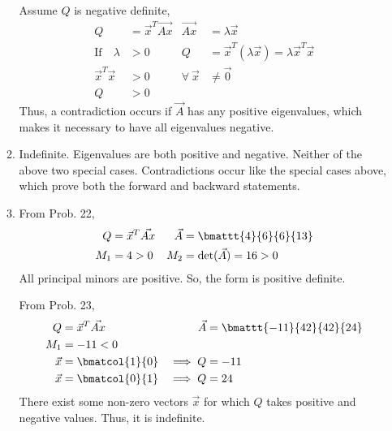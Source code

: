 \begin{enumerate}
\begin{enumerate}
                    Assume $ Q $ is negative definite,
                    \begin{align}
                        Q                        & = \vec{x}^T \vec{Ax}          &
                        \vec{Ax}                 & = \lambda \vec{x}               \\
                        \text{If} \quad  \lambda & > 0                           &
                        Q                        & = \vec{x}^T (\lambda \vec{x})
                        = \lambda \vec{x}^T \vec{x}                                \\
                        \vec{x}^T \vec{x}        & > 0                           &
                        \forall\ \vec{x}         & \neq \vec{0}                    \\
                        Q                        & > 0
                    \end{align}
                    Thus, a contradiction occurs if $ \vec{A} $ has any positive
                    eigenvalues, which makes it necessary to have all eigenvalues
                    negative.

              \item Indefinite. Eigenvalues are both positive and negative.
                    Neither of the above two special cases. Contradictions occur like
                    the special cases above, which prove both the forward and backward
                    statements.

              \item From Prob. 22,
                    \begin{align}
                        Q       & = \vec{x}^T \vec{Ax}     &
                        \vec{A} & = \bmattt{4}{6}{6}{13}     \\
                        M_1     & = 4 > 0                  &
                        M_2     & = \det(\vec{A}) = 16 > 0   \\
                    \end{align}
                    All principal minors are positive. So, the form is positive
                    definite. \par
                    From Prob. 23,
                    \begin{align}
                        Q          & = \vec{x}^T \vec{Ax}       &
                        \vec{A}    & = \bmattt{-11}{42}{42}{24}   \\
                        M_1        & = -11 < 0                    \\
                        \vec{x}    & = \bmatcol{1}{0}           &
                        \implies Q & = -11 \\
                        \vec{x}    & = \bmatcol{0}{1}           &
                        \implies Q & = 24
                    \end{align}
                    There exist some non-zero vectors $ \vec{x} $ for which $ Q $ takes
                    positive and negative values. Thus, it is indefinite.
          \end{enumerate}
\end{enumerate}